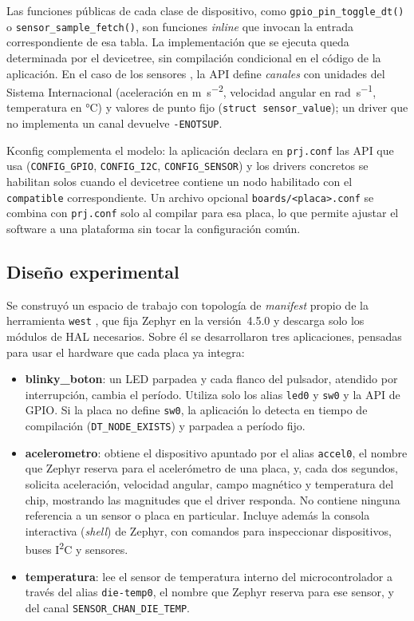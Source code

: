 Las funciones públicas de cada clase de dispositivo, como \texttt{gpio\_pin\_toggle\_dt()} o \texttt{sensor\_sample\_fetch()}, son funciones \emph{inline} que invocan la entrada correspondiente de esa tabla. La implementación que se ejecuta queda determinada por el devicetree, sin compilación condicional en el código de la aplicación. En el caso de los sensores \cite{zephyr_sensor_api}, la API define \emph{canales} con unidades del Sistema Internacional (aceleración en \unit{\metre\per\second\squared}, velocidad angular en \unit{\radian\per\second}, temperatura en \unit{\degreeCelsius}) y valores de punto fijo (\texttt{struct sensor\_value}); un driver que no implementa un canal devuelve \texttt{-ENOTSUP}.

Kconfig complementa el modelo: la aplicación declara en \texttt{prj.conf} las API que usa (\texttt{CONFIG\_GPIO}, \texttt{CONFIG\_I2C}, \texttt{CONFIG\_SENSOR}) y los drivers concretos se habilitan solos cuando el devicetree contiene un nodo habilitado con el \texttt{compatible} correspondiente. Un archivo opcional \texttt{boards/<placa>.conf} se combina con \texttt{prj.conf} solo al compilar para esa placa, lo que permite ajustar el software a una plataforma sin tocar la configuración común.

\subsection{Diseño experimental}

Se construyó un espacio de trabajo con topología de \emph{manifest} propio de la herramienta \texttt{west} \cite{zephyr_west}, que fija Zephyr en la versión~4.5.0 y descarga solo los módulos de HAL necesarios. Sobre él se desarrollaron tres aplicaciones, pensadas para usar el hardware que cada placa ya integra:

\begin{itemize}
    \item \textbf{blinky\_boton}: un LED parpadea y cada flanco del pulsador, atendido por interrupción, cambia el período. Utiliza solo los alias \texttt{led0} y \texttt{sw0} y la API de GPIO. Si la placa no define \texttt{sw0}, la aplicación lo detecta en tiempo de compilación (\texttt{DT\_NODE\_EXISTS}) y parpadea a período fijo.
    \item \textbf{acelerometro}: obtiene el dispositivo apuntado por el alias \texttt{accel0}, el nombre que Zephyr reserva para el acelerómetro de una placa, y, cada dos segundos, solicita aceleración, velocidad angular, campo magnético y temperatura del chip, mostrando las magnitudes que el driver responda. No contiene ninguna referencia a un sensor o placa en particular. Incluye además la consola interactiva (\emph{shell}) de Zephyr, con comandos para inspeccionar dispositivos, buses I\textsuperscript{2}C y sensores.
    \item \textbf{temperatura}: lee el sensor de temperatura interno del microcontrolador a través del alias \texttt{die-temp0}, el nombre que Zephyr reserva para ese sensor, y del canal \texttt{SENSOR\_CHAN\_\allowbreak DIE\_TEMP}.
\end{itemize}

